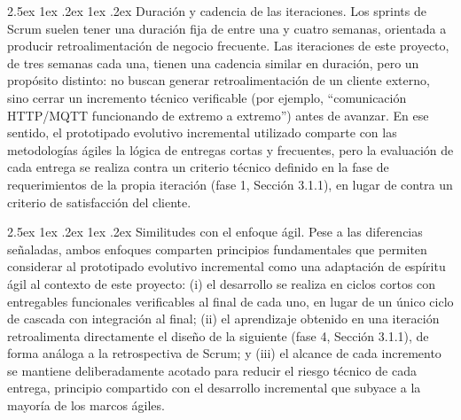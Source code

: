 \documentclass{iccmemoria}
\makeatletter
\renewcommand\paragraph{%
  \@startsection{paragraph}{4}{0pt}%
    {2.5ex \@plus 1ex \@minus .2ex}%
    {1ex \@plus .2ex}%
    {\normalfont\normalsize\bfseries}}
\makeatother
\begin{document}
\paragraph{Duración y cadencia de las iteraciones.} Los sprints de Scrum suelen tener una duración fija de entre una y cuatro semanas, orientada a producir retroalimentación de negocio frecuente. Las iteraciones de este proyecto, de tres semanas cada una, tienen una cadencia similar en duración, pero un propósito distinto: no buscan generar retroalimentación de un cliente externo, sino cerrar un incremento técnico verificable (por ejemplo, ``comunicación HTTP/MQTT funcionando de extremo a extremo'') antes de avanzar. En ese sentido, el prototipado evolutivo incremental utilizado comparte con las metodologías ágiles la lógica de entregas cortas y frecuentes, pero la evaluación de cada entrega se realiza contra un criterio técnico definido en la fase de requerimientos de la propia iteración (fase 1, Sección 3.1.1), en lugar de contra un criterio de satisfacción del cliente.

\paragraph{Similitudes con el enfoque ágil.} Pese a las diferencias señaladas, ambos enfoques comparten principios fundamentales que permiten considerar al prototipado evolutivo incremental como una adaptación de espíritu ágil al contexto de este proyecto: (i) el desarrollo se realiza en ciclos cortos con entregables funcionales verificables al final de cada uno, en lugar de un único ciclo de cascada con integración al final; (ii) el aprendizaje obtenido en una iteración retroalimenta directamente el diseño de la siguiente (fase 4, Sección 3.1.1), de forma análoga a la retrospectiva de Scrum; y (iii) el alcance de cada incremento se mantiene deliberadamente acotado para reducir el riesgo técnico de cada entrega, principio compartido con el desarrollo incremental que subyace a la mayoría de los marcos ágiles.
\end{document}
